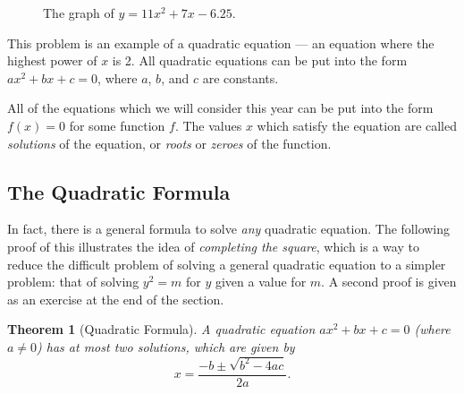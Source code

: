 \documentclass[a4paper,10pt,titlepage]{article}
\newtheorem*{thm}{Theorem}
\theoremstyle{definition}
\begin{document}
\begin{figure}
  \centering
  \caption{The graph of $ y = 11x^2 + 7x - 6.25 $.\label{fig:parabola1}}
\end{figure}

This problem is an example of a quadratic equation --- an equation where the highest
power of $ x $ is 2. All quadratic equations can be put into the form $ ax^2 + bx + c = 0 $,
where $ a $, $ b $, and $ c $ are constants.

All of the equations which we will consider this year can be put into the form $ f(x) = 0 $ for
some function $ f $. The values $ x $ which satisfy the equation are called \emph{solutions} of
the equation, or \emph{roots} or \emph{zeroes} of the function.

\subsection*{The Quadratic Formula}
In fact, there is a general formula to solve \emph{any} quadratic equation. The
following proof of this illustrates the idea of \emph{completing the square}, which
is a way to reduce the difficult problem of solving a general quadratic equation to a simpler
problem: that of solving $ y^2 = m $ for $ y $ given a value for $ m $. A second
proof is given as an exercise at the end of the section.

\begin{thm}[Quadratic Formula]
  A quadratic equation $ ax^2 + bx + c = 0 $ (where $ a \neq 0 $) has at most
  two solutions, which are given by
  \begin{displaymath}
    x = \frac{-b \pm \sqrt{b^2 - 4ac}}{2a}.
  \end{displaymath}
\end{thm}
\end{document}
